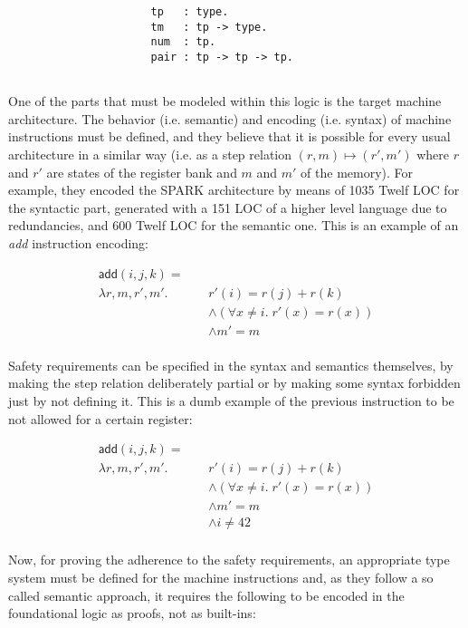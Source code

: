 \documentclass{article}
\begin{document}
\begin{verbatim}
                      tp   : type.
                      tm   : tp -> type.
                      num  : tp.
                      pair : tp -> tp -> tp.
                      
\end{verbatim}

One of the parts that must be modeled within this logic is 
the target machine architecture. The behavior (i.e. 
semantic) and encoding (i.e. syntax) of machine 
instructions must be defined, and they believe that it is
possible for every usual architecture in a similar way 
(i.e. as a step relation $(r,m) \mapsto (r',m')$ where $r$ 
and $r'$ are states of the register bank and $m$ and $m'$ 
of the memory). For example, they encoded the SPARK 
architecture by means of 1035 Twelf LOC for the syntactic 
part, generated with a 151 LOC of a higher level language 
due to redundancies, and 600 Twelf LOC for the semantic 
one. This is an example of an \textit{add} instruction 
encoding:

\begin{align*}
  \mathsf{add}(i, j, k) = \;\;\;\;&\\ 
    \lambda r,m,r',m'.\;&r'(i) = r(j) + r(k) \\
      &\land (\forall x \neq i.\;r'(x) = r(x)) \\
      &\land m' = m \\
\end{align*}

Safety requirements can be specified in the syntax and 
semantics themselves, by making the step relation 
deliberately partial or by making some syntax forbidden 
just by not defining it. This is a dumb example of the 
previous instruction to be not allowed for a certain 
register:

\begin{align*}
  \mathsf{add}(i, j, k) = \;\;\;\;&\\ 
    \lambda r,m,r',m'.\;&r'(i) = r(j) + r(k) \\
      &\land (\forall x \neq i.\;r'(x) = r(x)) \\
      &\land m' = m \\
      &\land i \neq 42 \\
\end{align*}

Now, for proving the adherence to the safety requirements,
an appropriate type system must be defined for the machine
instructions and, as they follow a so called semantic 
approach, it requires the following to be encoded in the 
foundational logic as proofs, not as built-ins:
\end{document}
